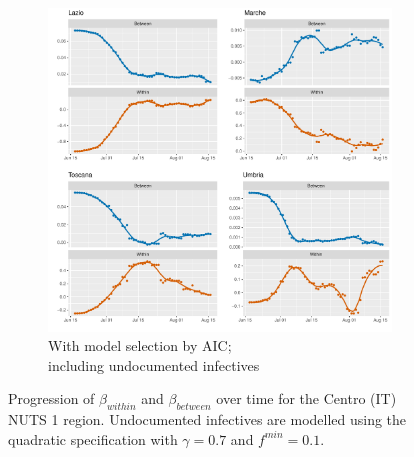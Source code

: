 \documentclass[12pt]{article}
\begin{document}
\begin{appendices}
\begin{figure}[H]
\begin{subfigure}{\textwidth}
    	      \includegraphics[width=\linewidth]{output/model_between_lag14_betas_Centro (IT)_aic_UndocQuadratic_rolling.pdf}
    	      \caption{With model selection by AIC; \\ including undocumented infectives}
    	      \label{fig:beta_between_over_time_centro_aic_undoc}
    	    \end{subfigure}
    	    \caption{Progression of $\beta_{within}$ and $\beta_{between}$ over time for the Centro (IT) NUTS 1 region. Undocumented infectives are modelled using the quadratic specification with $\gamma = 0.7$ and $f^{min}=0.1$.}
    	    \label{fig:beta_between_over_time_centro}
        \end{figure}
		

\end{appendices}
\end{document}
